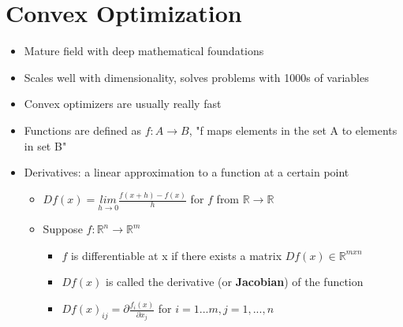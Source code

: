 \documentclass[../main.tex]{subfiles}
\begin{document}
    \section{Convex Optimization}
    \begin{itemize}
        \item Mature field with deep mathematical foundations
        \item Scales well with dimensionality, solves problems with 1000s of variables
        \item Convex optimizers are usually really fast
        \item Functions are defined as $f: A \rightarrow B$, "f maps elements in the set A to elements in set B"
        \item Derivatives: a linear approximation to a function at a certain point
        \begin{itemize}
            \item $Df(x) = \underset{h \rightarrow 0}{lim} \frac{f(x + h) - f(x)}{h}$ for $f$ from $\mathbb{R} \rightarrow \mathbb{R}$
            \item Suppose $f: \mathbb{R}^{n} \rightarrow \mathbb{R}^{m}$
            \begin{itemize}
                \item $f$ is differentiable at x if there exists a matrix $Df(x) \in \mathbb{R}^{m x n}$
                \item $Df(x)$ is called the derivative (or \textbf{Jacobian}) of the function
                \item $Df(x)_{ij} = \partial \frac{f_{i}(x)}{\partial x_{j}}$ for $i = 1 ... m, j = 1, ..., n$
            \end{itemize}
        \end{itemize}
    \end{itemize}
\end{document}
